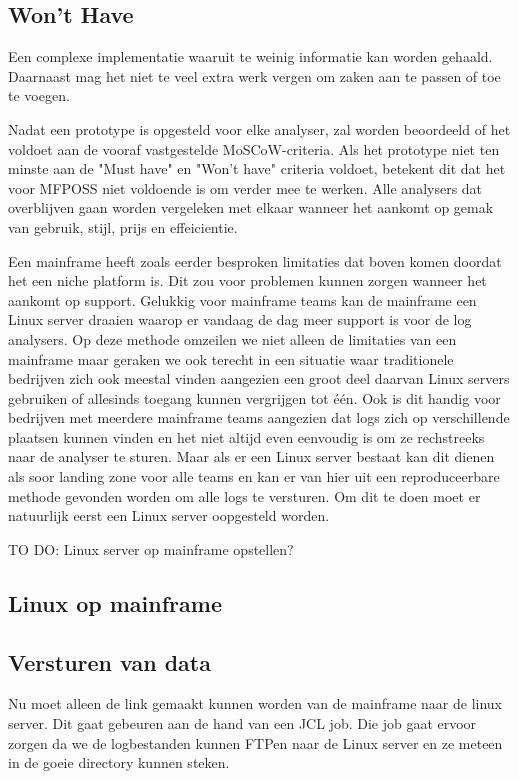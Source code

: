 \subsection{Won't Have}
Een complexe implementatie waaruit te weinig informatie kan worden gehaald. Daarnaast mag het niet te veel extra werk vergen om zaken aan te passen of toe te voegen.

Nadat een prototype is opgesteld voor elke analyser, zal worden beoordeeld of het voldoet aan de vooraf vastgestelde MoSCoW-criteria. Als het prototype niet ten minste aan de "Must have" en "Won't have" criteria voldoet, betekent dit dat het voor MFPOSS niet voldoende is om verder mee te werken. Alle analysers dat overblijven gaan worden vergeleken met elkaar wanneer het aankomt op gemak van gebruik, stijl, prijs en effeicientie.

Een mainframe heeft zoals eerder besproken limitaties dat boven komen doordat het een niche platform is. Dit zou voor problemen kunnen zorgen wanneer het aankomt op support. Gelukkig voor mainframe teams kan de mainframe een Linux server draaien waarop er vandaag de dag meer support is voor de log analysers. Op deze methode omzeilen we niet alleen de limitaties van een mainframe maar geraken we ook terecht in een situatie waar traditionele bedrijven zich ook meestal vinden aangezien een groot deel daarvan Linux servers gebruiken of allesinds toegang kunnen vergrijgen tot één. Ook is dit handig voor bedrijven met meerdere mainframe teams aangezien dat logs zich op verschillende plaatsen kunnen vinden en het niet altijd even eenvoudig is om ze rechstreeks naar de analyser te sturen. Maar als er een Linux server bestaat kan dit dienen als soor landing zone voor alle teams en kan er van hier uit een reproduceerbare methode gevonden worden om alle logs te versturen. Om dit te doen moet er natuurlijk eerst een Linux server oopgesteld worden. 

TO DO: Linux server op mainframe opstellen?
\subsection{Linux op mainframe}

\subsection{Versturen van data}
Nu moet alleen de link gemaakt kunnen worden van de mainframe naar de linux server. Dit gaat gebeuren aan de hand van een JCL job. Die job gaat ervoor zorgen da we de logbestanden kunnen FTPen naar de Linux server en ze meteen in de goeie directory kunnen steken.

